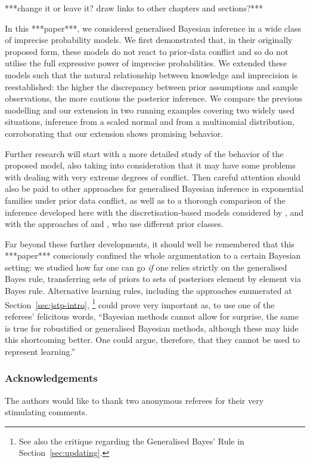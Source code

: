 ***change it or leave it? draw links to other chapters and sections?***

In this ***paper***, we considered generalised Bayesian inference
in a wide class of imprecise probability models. We first
demonstrated that, in their originally proposed form, these models
do not react to prior-data conflict and so do not utilise
the full expressive power of imprecise probabilities. We
extended these models such that the natural relationship between
knowledge and imprecision is reestablished: the higher the
discrepancy between prior assumptions and sample observations, the
more cautious the posterior inference. We compare the previous
modelling and our extension in two running examples covering two
widely used situations, inference from a scaled normal and
from a multinomial distribution, corroborating that our extension
shows promising behavior.

Further research will start with a more detailed study of
the behavior of the proposed model, also taking into consideration
that it may have some problems with dealing with very extreme
degrees of conflict. Then careful attention should also be paid to
other approaches for generalised Bayesian inference in exponential
families \parencite{1993:coolen, 1997:boratynska} under prior data
conflict, as well as to a thorough comparison of the inference
developed here with the discretisation-based models considered by
\textcite{2005:whitcomb}, and with the approaches of \textcite{1991:pericchi}
and \textcite{1994:coolen}, who use different prior classes.

Far beyond these further developments, it should well be
remembered that this ***paper*** consciously confined the whole
argumentation to a certain Bayesian setting: we studied how far
one can go \emph{if} one relies strictly on the generalised Bayes
rule, transferring sets of priors to sets of posteriors element by
element via Bayes rule. Alternative learning
rules, including the approaches enumerated at Section~\ref{sec:jstp-intro},%
\footnote{See also the critique regarding the Generalised Bayes' Rule in Section~\ref{sec:updating}.}
could prove very important as, to use one of the referees'
felicitous words, ``Bayesian methods cannot allow for surprise, the same is
true for robustified or generalised Bayesian methods, although these
may hide this shortcoming better. One could argue, therefore, that
they cannot be used to represent learning.''

\subsubsection*{Acknowledgements}
The authors would like to thank two anonymous referees for their very stimulating comments.



